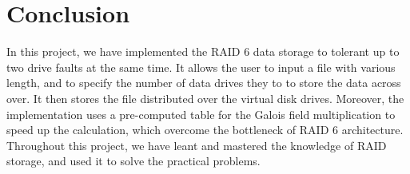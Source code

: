 \section{Conclusion}

In this project, we have implemented the RAID 6 data storage to tolerant up to two drive faults at the same time. It allows the user to input a file with various length, and to specify the number of data drives they to to store the data across over. It then stores the file distributed over the virtual disk drives. Moreover, the implementation uses a pre-computed table for the Galois field multiplication to speed up the calculation, which overcome the bottleneck of RAID 6 architecture. Throughout this project, we have leant and mastered the knowledge of RAID storage, and used it to solve the practical problems.